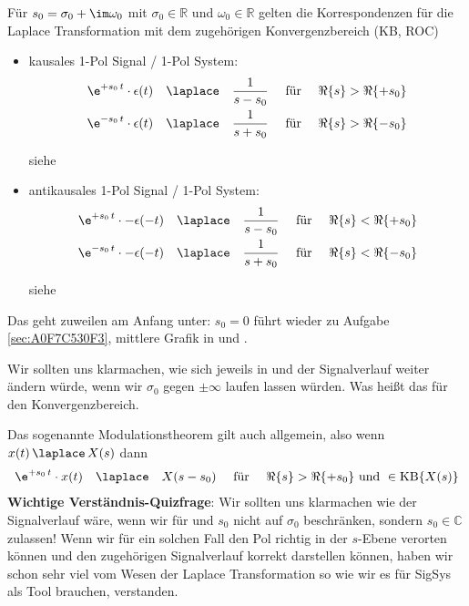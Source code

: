 \begin{Loesung}
%
Für $s_0=\sigma_0 + \im \omega_0$ mit $\sigma_0\in\mathbb{R}$ und $\omega_0\in\mathbb{R}$
gelten die Korrespondenzen für die Laplace Transformation mit dem zugehörigen
Konvergenzbereich (KB, ROC)
%
\begin{itemize}
  \item kausales 1-Pol Signal / 1-Pol System:
  \begin{align}
  \e^{+s_0 \, t} \cdot \epsilon(t) \quad \laplace \quad \frac{1}{s-s_0} \quad\text{ für } \quad\Re\{s\} > \Re\{+s_0\}\\
  \e^{-s_0 \, t} \cdot \epsilon(t) \quad \laplace \quad \frac{1}{s+s_0} \quad\text{ für } \quad\Re\{s\} > \Re\{-s_0\}
  \end{align}

  siehe 

  \item antikausales 1-Pol Signal / 1-Pol System:
  \begin{align}
  \e^{+s_0 \, t} \cdot -\epsilon(-t) \quad \laplace \quad \frac{1}{s-s_0} \quad\text{ für } \quad\Re\{s\} < \Re\{+s_0\}\\
  \e^{-s_0 \, t} \cdot -\epsilon(-t) \quad \laplace \quad \frac{1}{s+s_0} \quad\text{ für } \quad\Re\{s\} < \Re\{-s_0\}
  \end{align}

  siehe 

\end{itemize}
%
Das geht zuweilen am Anfang unter: $s_0=0$ führt wieder zu Aufgabe \ref{sec:A0F7C530F3},
mittlere Grafik in  und .

Wir sollten uns klarmachen, wie sich jeweils in
 und  der
Signalverlauf weiter ändern würde, wenn
wir $\sigma_0$ gegen $\pm\infty$ laufen lassen würden.
Was heißt das für den Konvergenzbereich.

Das sogenannte Modulationstheorem gilt auch allgemein, also wenn
$x(t) \,\laplace\, X(s)$
%
dann
\begin{align}
\e^{+s_0 \, t} \cdot x(t) \quad \laplace \quad X(s-s_0) \quad\text{ für } \quad\Re\{s\} > \Re\{+s_0\}\textrm{ und }\in\mathrm{KB}\{X(s)\}
\end{align}
%
\textbf{Wichtige Verständnis-Quizfrage}:
Wir sollten uns klarmachen wie der Signalverlauf wäre, wenn wir
für  und 
$s_0$ nicht auf $\sigma_0$ beschränken, sondern $s_0\in\mathbb{C}$ zulassen!
Wenn wir für ein solchen Fall den Pol richtig in der $s$-Ebene verorten können
und den zugehörigen Signalverlauf korrekt darstellen können, haben wir
schon sehr viel vom Wesen der Laplace Transformation so wie wir es für SigSys
als Tool brauchen, verstanden.
%
\end{Loesung}

